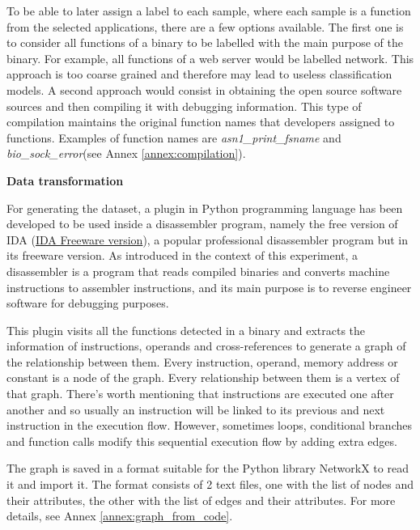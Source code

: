 To be able to later assign a label to each sample, where each sample is a function from the selected applications, there are a few options available. The first one is to consider all functions of a binary to be labelled with the main purpose of the binary. For example, all functions of a web server would be labelled network. This approach is too coarse grained and therefore may lead to useless classification models. A second approach would consist in obtaining the open source software sources and then compiling it with debugging information. This type of compilation maintains the original function names that developers assigned to functions. Examples of function names are \textit{asn1\_print\_fsname} and \textit{bio\_sock\_error}(see Annex \ref{annex:compilation}).



\textbf{Data transformation}

For generating the dataset, a plugin in Python programming language has been developed to be used inside a disassembler program, namely the free version of IDA (\href{https://www.hex-rays.com/products/ida/support/download\_freeware.shtml}{IDA Freeware version}), a popular professional disassembler program but in its freeware version. As introduced in the context of this experiment, a disassembler is a program that reads compiled binaries and converts machine instructions to assembler instructions, and its main purpose is to reverse engineer software for debugging purposes.


This plugin visits all the functions detected in a binary and extracts the information of instructions, operands and cross-references to generate a graph of the relationship between them. Every instruction, operand, memory address or constant is a node of the graph. Every relationship between them is a vertex of that graph. There's worth mentioning that instructions are executed one after another and so usually an instruction will be linked to its previous and next instruction in the execution flow. However, sometimes loops, conditional branches and function calls modify this sequential execution flow by adding extra edges.

The graph is saved in a format suitable for the Python library NetworkX to read it and import it. The format consists of 2 text files, one with the list of nodes and their attributes, the other with the list of edges and their attributes. For more details, see Annex \ref{annex:graph_from_code}.




